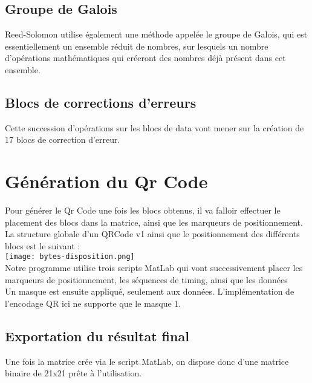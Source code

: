 \documentclass{report}
\begin{document}
		\subsection{Groupe de Galois}

			Reed-Solomon utilise également une méthode appelée le groupe de Galois, qui est essentiellement un ensemble réduit de nombres, sur lesquels un nombre d'opérations mathématiques qui créeront des nombres déjà présent dans cet ensemble.\\

		\subsection{Blocs de corrections d'erreurs}

			Cette succession d'opérations sur les blocs de data vont mener sur la création de 17 blocs de correction d'erreur.\\

	\section{Génération du Qr Code}

		Pour générer le Qr Code une fois les blocs obtenus, il va falloir effectuer le placement des blocs dans la matrice, ainsi que les marqueurs de positionnement.\\

		La structure globale d'un QRCode v1 ainsi que le positionnement des différents blocs est le suivant : \\

		\texttt{[image: bytes-disposition.png]}\\

		Notre programme utilise trois scripts MatLab qui vont successivement placer les marqueurs de positionnement, les séquences de timing, ainsi que les données\\
		
		Un masque est ensuite appliqué, seulement aux données. L'implémentation de l'encodage QR ici ne supporte que le masque 1.

		\subsection{Exportation du résultat final}

			Une fois la matrice crée via le script MatLab, on dispose donc d'une matrice binaire de 21x21 prête à l'utilisation.\\
\end{document}
